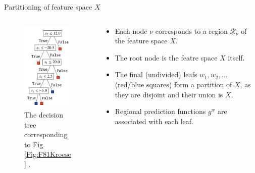 \documentclass{beamer}
\begin{document}
\begin{frame}{Partitioning of feature space $X$}
    \begin{columns}
        \begin{column}{0.4\linewidth}
            \begin{figure}
                \includegraphics[width=0.7\linewidth]{F82Kroese}
                \caption{The decision tree corresponding to Fig. \ref{Fig:F81Kroese} \cite{kroese2020}.}
                \label{Fig:F82Kroese}
            \end{figure}
        \end{column}
        \begin{column}{0.6\linewidth}
           
            \begin{itemize}
                \item Each node $\nu$ corresponds to a region $\mathcal{R}_{\nu}$ of the feature space $X$. 
                \item The root node is the featre space $X$ itself.
                \item The final (undivided) leafs $w_1, w_2, \ldots$ (red/blue squares) form a partition of $X$, as they are disjoint and their union is $X$.
                \item Regional prediction functions $g^w$ are associated with each leaf.
            \end{itemize}
        \end{column}
    \end{columns}
\end{frame}
\end{document}
